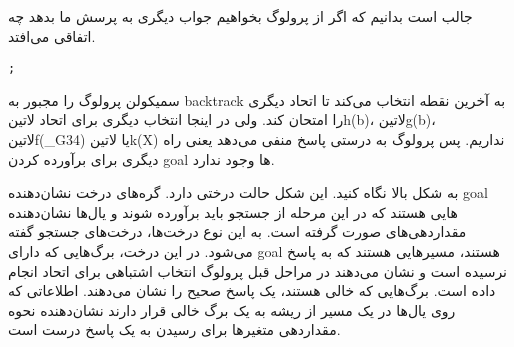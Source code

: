 \begin{latin}
\end{latin}

جالب است بدانیم که اگر از پرولوگ بخواهیم جواب دیگری به پرسش ما بدهد چه اتفاقی می‌افتد.

\begin{latin}
\begin{lstlisting}
;
\end{lstlisting}
\end{latin}

سمیکولن پرولوگ را مجبور به backtrack به آخرین نقطه انتخاب می‌کند تا اتحاد دیگری را امتحان کند. ولی در اینجا انتخاب دیگری برای اتحاد ‌لاتین{h(b)}، ‌لاتین{g(b)}، ‌لاتین{f(\_G34)} یا ‌لاتین{k(X)} نداریم. پس پرولوگ به درستی پاسخ منفی می‌دهد یعنی راه دیگری برای برآورده کردن goal ها وجود ندارد.

به شکل بالا نگاه کنید. این شکل حالت درختی دارد. گره‌های درخت نشان‌دهنده goal هایی هستند که در این مرحله از جستجو باید برآورده شوند و یال‌ها نشان‌دهنده مقداردهی‌های صورت گرفته است. به این نوع درخت‌ها، درخت‌های جستجو گفته می‌شود. در این درخت، برگ‌هایی که دارای goal هستند، مسیرهایی هستند که به پاسخ نرسیده است و نشان می‌دهند در مراحل قبل پرولوگ انتخاب اشتباهی برای اتحاد انجام داده است. برگ‌هایی که خالی هستند، یک پاسخ صحیح را نشان می‌دهند. اطلاعاتی که روی یال‌ها در یک مسیر از ریشه به یک برگ خالی قرار دارند نشان‌دهنده نحوه مقداردهی متغیرها برای رسیدن به یک پاسخ درست است.

